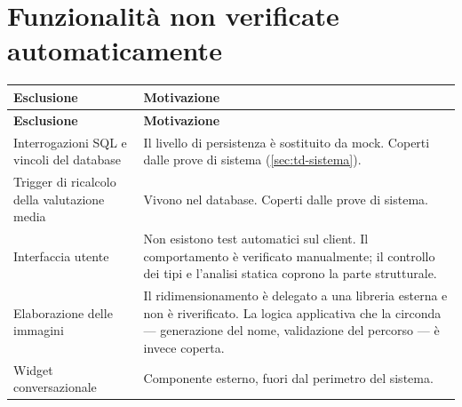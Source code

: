 \section{Funzionalità non verificate automaticamente}

\begin{longtable}{@{}L{4.4cm} L{10.0cm}@{}}
\toprule
\textbf{Esclusione} & \textbf{Motivazione} \\
\midrule
\endfirsthead
\toprule
\textbf{Esclusione} & \textbf{Motivazione} \\
\midrule
\endhead
\bottomrule
\endlastfoot

Interrogazioni SQL e vincoli del database &
Il livello di persistenza è sostituito da mock. Coperti dalle prove di
sistema (\cref{sec:td-sistema}). \\

Trigger di ricalcolo della valutazione media &
Vivono nel database. Coperti dalle prove di sistema. \\

Interfaccia utente &
Non esistono test automatici sul client. Il comportamento è verificato
manualmente; il controllo dei tipi e l'analisi statica coprono la parte
strutturale. \\

Elaborazione delle immagini &
Il ridimensionamento è delegato a una libreria esterna e non è
riverificato. La logica applicativa che la circonda — generazione del nome,
validazione del percorso — è invece coperta. \\

Widget conversazionale &
Componente esterno, fuori dal perimetro del sistema. \\

\end{longtable}
